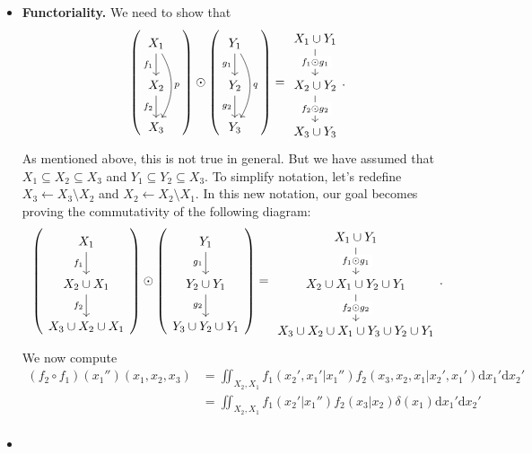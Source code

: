 \begin{itemize}[wide,]
\item \textbf{Functoriality.}
We need to show that
\[
\left(
\begin{tikzcd}
    X_1 \ar[d,"f_1"'] \ar[dd,bend left,"p"] \\ 
    X_2 \ar[d,"f_2"'] \\
    X_3
\end{tikzcd}
\right) 
\odot
\left(
\begin{tikzcd}
    Y_1 \ar[d,"g_1"'] \ar[dd,bend left, "q"] \\ 
    Y_2 \ar[d,"g_2"'] \\
    Y_3
\end{tikzcd}
\right) 
= 
\begin{tikzcd}[row sep=5ex]
    X_1 \cup Y_1 \ar[d,"f_1 \odot g_1"description]  \\ 
    X_2 \cup Y_2 \ar[d,"f_2 \odot g_2"description] \\
    X_3 \cup Y_3
\end{tikzcd}.
\]
As mentioned above, this is not true in general. But we have assumed that $X_1 \subseteq X_2 \subseteq X_3$ and $Y_1 \subseteq Y_2 \subseteq X_3$.
To simplify notation, let's redefine $X_3 \gets X_3 \setminus X_2$ and $X_2 \gets X_2 \setminus X_1$. 
In this new notation, our goal becomes proving the commutativity of the following diagram:
\[
\left(
\begin{tikzcd}
    X_1 \ar[d,"f_1"']  \\ 
    X_2 \cup X_1\ar[d,"f_2"'] \\
    X_3 \cup X_2 \cup X_1
\end{tikzcd}
\right) 
\odot
\left(
\begin{tikzcd}
    Y_1 \ar[d,"g_1"'] \\ 
    Y_2 \cup Y_1 \ar[d,"g_2"'] \\
    Y_3 \cup Y_2 \cup Y_1
\end{tikzcd}
\right) 
= 
\begin{tikzcd}[row sep=5ex]
    X_1 \cup Y_1 \ar[d,"f_1 \odot g_1"description]  \\ 
    X_2 \cup X_1 \cup Y_2 \cup Y_1 \ar[d,"f_2 \odot g_2"description] \\
    X_3 \cup X_2 \cup X_1 \cup Y_3 \cup Y_2 \cup Y_1
\end{tikzcd}.
\]
We now compute
\begin{align*}
    (f_2 \circ f_1) (x_1'')(x_1,x_2,x_3) 
         &= \iint_{X_2,X_1} f_1(x_2',x_1'|x_1'') f_2(x_3,x_2,x_1|x_2',x_1') \mathrm d x_1' \mathrm d x_2' \\
         &= \iint_{X_2,X_1} f_1(x_2'|x_1'') 
            f_2(x_3|x_2) \delta(x_1) \mathrm d x_1' \mathrm d x_2' \\
\end{align*}

\item 


\end{itemize}


